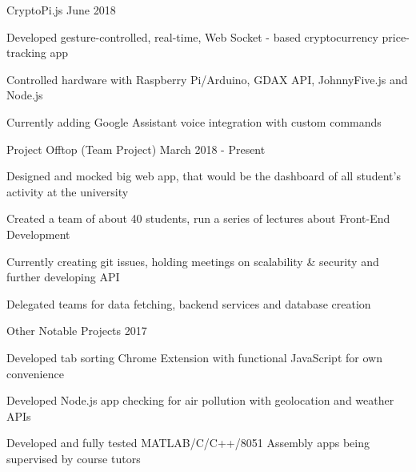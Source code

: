 \begin{cventries}
\cventryproject
{CryptoPi.js} %
{June 2018} %
  {
    \begin{cvitems} %
      \item Developed gesture-controlled, real-time, Web Socket - based cryptocurrency price-tracking app
      \item Controlled hardware with  Raspberry Pi/Arduino, GDAX API, JohnnyFive.js and Node.js
      \item Currently adding Google Assistant voice integration with custom commands
  \end{cvitems}
  }

\cventryproject
{Project Offtop (Team Project)} %
{March 2018 - Present} %
  {
    \begin{cvitems} %
      \item Designed and mocked big web app, that would be the dashboard of all student's activity at the university
      \item Created a team of about 40 students, run a series of lectures about Front-End Development
      \item Currently creating git issues, holding meetings on scalability \& security and further developing API
      \item Delegated teams for data fetching, backend services and database creation
      \end{cvitems}
  }

\cventryproject
{Other Notable Projects} %
{2017} %
  {
    \begin{cvitems} %
      \item Developed tab sorting Chrome Extension with functional JavaScript for own convenience
      \item Developed Node.js app checking for air pollution with geolocation and weather APIs
      \item Developed and fully tested MATLAB/C/C++/8051 Assembly apps being supervised by course tutors
  \end{cvitems}
  }

\end{cventries}
